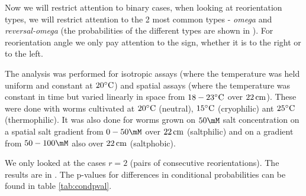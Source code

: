 \documentclass[12pt]{article}
\begin{document}
Now we will restrict attention to binary cases, \ie when looking at reorientation types, we will restrict attention to the 2 most common types - \emph{omega} and \emph{reversal-omega} (the probabilities of the different types are shown in ). For reorientation angle we only pay attention to the sign, \ie whether it is to the right or to the left.

The analysis was performed for isotropic assays (where the temperature was held uniform and constant at $20^\circ\mathrm{C}$) and spatial assays (where the temperature was constant in time but varied linearly in space from $18-23^\circ\mathrm{C}$ over $22\,\mathrm{cm}$). These were done with worms cultivated at $20^\circ\mathrm{C}$ (neutral), $15^\circ\mathrm{C}$ (cryophilic) ant $25^\circ\mathrm{C}$ (thermophilic). It was also done for worms grown on $50\mM$ salt concentration on a spatial salt gradient from $0-50\mM$ over $22\,\mathrm{cm}$ (saltphilic) and on a gradient from $50-100\mM$ also over $22\,\mathrm{cm}$ (saltphobic).

We only looked at the cases $r=2$ (pairs of consecutive reorientations). The results are in . The p-values for differences in conditional probabilities can be found in table \ref{tab:condpval}.
\end{document}
